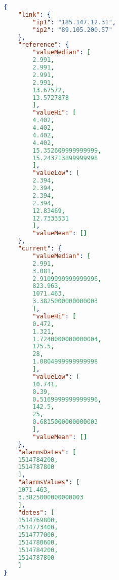 \begin{lstlisting}[language=json,firstnumber=1, caption={Exemple des résultats de l'analyse d'un lien}, label=resultLink]
{
	"link": {
		"ip1": "185.147.12.31",
		"ip2": "89.105.200.57"
	},
	"reference": {
		"valueMedian": [
		2.991,
		2.991,
		2.991,
		2.991,
		13.67572,
		13.5727878
		],
		"valueHi": [
		4.402,
		4.402,
		4.402,
		4.402,
		15.352609999999999,
		15.243713899999998
		],
		"valueLow": [
		2.394,
		2.394,
		2.394,
		2.394,
		12.83469,
		12.7333531
		],
		"valueMean": []
	},
	"current": {
		"valueMedian": [
		2.991,
		3.081,
		2.9109999999999996,
		823.963,
		1071.463,
		3.3825000000000003
		],
		"valueHi": [
		0.472,
		1.321,
		1.7240000000000004,
		175.5,
		28,
		1.0804999999999998
		],
		"valueLow": [
		10.741,
		0.39,
		0.5169999999999996,
		142.5,
		25,
		0.6815000000000003
		],
		"valueMean": []
	},
	"alarmsDates": [
	1514784200,
	1514787800
	],
	"alarmsValues": [
	1071.463,
	3.3825000000000003
	],
	"dates": [
	1514769800,
	1514773400,
	1514777000,
	1514780600,
	1514784200,
	1514787800
	]
}
\end{lstlisting}
